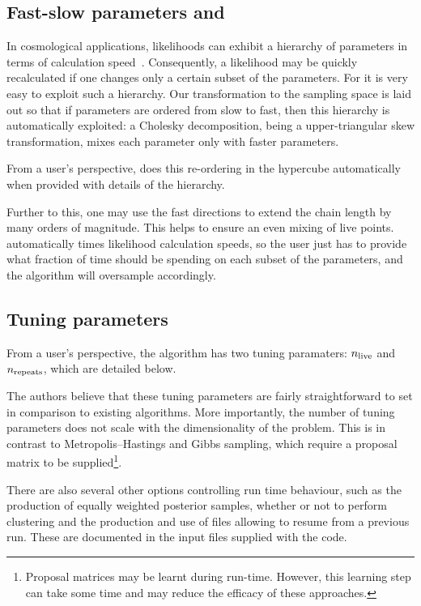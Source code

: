 \subsection{Fast-slow parameters and \CosmoChord}
\label{sec:pc:fast_slow}

In cosmological applications, likelihoods can exhibit a hierarchy of parameters in terms of calculation speed~\citep{LewisFastSlow}. Consequently, a likelihood may be quickly recalculated if one changes only a certain subset of the parameters. For \PolyChord{} it is very easy to exploit such a hierarchy. Our transformation to the sampling space is laid out so that if parameters are ordered from slow to fast, then this hierarchy is automatically exploited: a Cholesky decomposition, being a upper-triangular skew transformation, mixes each parameter only with faster parameters.

From a user's perspective, \PolyChord{} does this re-ordering in the hypercube automatically when provided with details of the hierarchy.

Further to this, one may use the fast directions to extend the chain length by many orders of magnitude. This helps to ensure an even mixing of live points. \PolyChord{} automatically times likelihood calculation speeds, so the user just has to provide what fraction of time \PolyChord{} should be spending on each subset of the parameters, and the algorithm will oversample accordingly.

\subsection{Tuning parameters}
\label{sec:pc:tuning_params}

From a user's perspective, the \PolyChord{} algorithm has two tuning paramaters: $n_{\mathrm{live}}$ and $n_{\mathrm{repeats}}$, which are detailed below.

The authors believe that these tuning parameters are fairly straightforward to set in comparison to existing algorithms. More importantly, the number of tuning parameters does not scale with the dimensionality of the problem. This is in contrast to Metropolis--Hastings and Gibbs sampling, which require a proposal matrix to be supplied\footnote{Proposal matrices may be learnt during run-time. However, this learning step can take some time and may reduce the efficacy of these approaches.}.

There are also several other options controlling run time behaviour, such as the production of equally weighted posterior samples, whether or not to perform clustering and the production and use of files allowing \PolyChord{} to resume from a previous run. These are documented in the input files supplied with the code.

